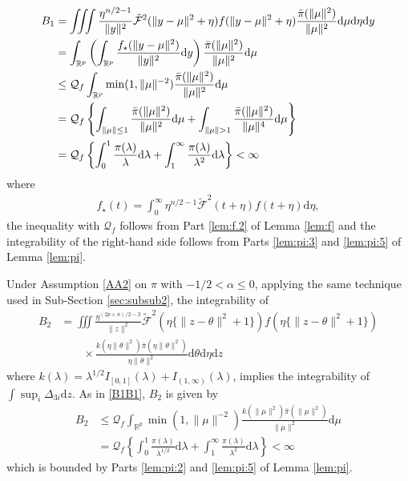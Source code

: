 \documentclass[preprint,11pt]{imsart}
\numberwithin{equation}{section}
\theoremstyle{plain}
\theoremstyle{definition}
\theoremstyle{remark}
\newcommand{\rd}{\mathrm{d}}
\begin{document}
\begin{align}
B_1 &=
 \iiint \frac{\eta^{n/2-1}}{\|y\|^2}   \tilde{\mathcal{F}}^2(\|y-\mu\|^2+\eta)
 f(\|y-\mu\|^2+\eta)
 \frac{\bar{\pi}(\|\mu\|^2)}{\|\mu\|^2}
  \rd \mu   \rd \eta  \rd y \notag\\
 &=
 \int_{\mathbb{R}^p}\left(\int_{\mathbb{R}^p}\frac{f_\star(\|y-\mu\|^2)}{\|y\|^2}\rd y\right)
  \frac{\bar{\pi}(\|\mu\|^2)}{\|\mu\|^2} \rd \mu \notag\\
 &\leq \mathcal{Q}_f
 \int_{\mathbb{R}^p}
\min(1,\|\mu\|^{-2})\frac{\bar{\pi}(\|\mu\|^2)}{\|\mu\|^2} \rd \mu \label{B1B1}\\
 &= \mathcal{Q}_f
 \left\{\int_{\|\mu\|\leq 1}\frac{\bar{\pi}(\|\mu\|^2)}{\|\mu\|^2} \rd \mu +
 \int_{\|\mu\|> 1}\frac{\bar{\pi}(\|\mu\|^2)}{\|\mu\|^4} \rd \mu \right\} \notag\\
 &= \mathcal{Q}_f
 \left\{\int_0^1 \frac{\pi(\lambda)}{\lambda} \rd \lambda +
\int_1^\infty \frac{\pi(\lambda)}{\lambda^2} \rd \lambda  \right\} <\infty \notag
\end{align}
where
 \begin{align*}
   f_\star(t)=\int_0^\infty \eta^{n/2-1}\tilde{\mathcal{F}}^2(t+\eta)f(t+\eta)\rd \eta,
 \end{align*}
 the inequality with $\mathcal{Q}_f$ follows from Part \ref{lem:f.2} of Lemma \ref{lem:f}
and the integrability of the right-hand side follows from
 Parts \ref{lem:pi:3} and \ref{lem:pi:5} of Lemma \ref{lem:pi}.

Under Assumption \ref{AA2} on $\pi$ with $-1/2<\alpha\leq 0$,
applying the same technique used in Sub-Section \ref{sec:subsub2},
the integrability of
\begin{align*}
B_2&= \iiint \frac{\eta^{(2p+n)/2-2}}{\|z\|^2}   \tilde{\mathcal{F}}^2(\eta\{\|z-\theta\|^2+1\})
 f(\eta\{\|z-\theta\|^2+1\}) \\
&\qquad \times \frac{k(\eta\|\theta\|^2)\bar{\pi}(\eta\|\theta\|^2)}{\eta\|\theta\|^2}
 \rd \theta   \rd \eta  \rd z 
\end{align*}
where $k(\lambda)=\lambda^{1/2}I_{[0,1]}(\lambda) + I_{(1,\infty)}(\lambda)$,
implies the integrability of $\int  \sup_i\Delta_{3i}\rd z$.
As in \eqref{B1B1}, $B_2$ is given by
\begin{align*}
B_2  &\leq \mathcal{Q}_f
 \int_{\mathbb{R}^p}
\min(1,\|\mu\|^{-2})\frac{k(\|\mu\|^2)\bar{\pi}(\|\mu\|^2)}{\|\mu\|^2} \rd \mu \\
 &= \mathcal{Q}_f
 \left\{
\int_0^1 \frac{\pi(\lambda)}{\lambda^{1/2}} \rd \lambda +
\int_1^\infty \frac{\pi(\lambda)}{\lambda^2} \rd \lambda 
 \right\} <\infty
\end{align*}
which is bounded by Parts \ref{lem:pi:2} and \ref{lem:pi:5} of Lemma \ref{lem:pi}.
\end{document}
